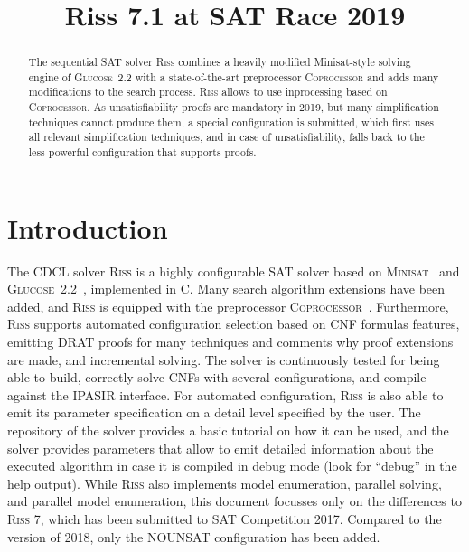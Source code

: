 \documentclass[conference]{IEEEtran}
\def\CC{{C\nolinebreak[4]\hspace{-.05em}\raisebox{.4ex}{\tiny\bf ++}}}
\begin{document}
	
\title{Riss 7.1 at SAT Race 2019}

\author{
}

\maketitle

\def\coprocessor{\textsc{Coprocessor}\xspace}
\def\glucose{\textsc{Glucose~2.2}\xspace}
\def\minisat{\textsc{Minisat~2.2}\xspace}
\def\riss{\textsc{Riss}\xspace}
\def\priss{\textsc{Priss}\xspace}

\begin{abstract}
The sequential SAT solver \riss combines a heavily modified Minisat-style solving engine of \glucose with a state-of-the-art preprocessor \textsc{Coprocessor} and adds many modifications to the search process. 
\riss allows to use inprocessing based on \coprocessor.
As unsatisfiability proofs are mandatory in 2019, but many simplification techniques cannot produce them, a special configuration is submitted, which first uses all relevant simplification techniques, and in case of unsatisfiability, falls back to the less powerful configuration that supports proofs.
\end{abstract}

\section{Introduction}

The CDCL solver \riss is a highly configurable SAT solver based on \textsc{Minisat}~\cite{EenS:2003} and \glucose ~\cite{AudemardS:2009,Audemard:2012:RRS:2405292.2405308}, implemented in \CC. 
Many search algorithm extensions have been added, and \riss is equipped with the preprocessor \textsc{Coprocessor}~\cite{Manthey:2012}. 
Furthermore, \riss supports automated configuration selection based on CNF formulas features, emitting DRAT proofs for many techniques and comments why proof extensions are made, and incremental solving.
The solver is continuously tested for being able to build, correctly solve CNFs with several configurations, and compile against the IPASIR interface.
For automated configuration, \riss is also able to emit its parameter specification on a detail level specified by the user.
The repository of the solver provides a basic tutorial on how it can be used, and the solver provides parameters that allow to emit detailed information about the executed algorithm in case it is compiled in debug mode (look for ``debug'' in the help output).
While \riss also implements model enumeration, parallel solving, and parallel model enumeration, this document focusses only on the differences to \textsc{Riss 7}, which has been submitted to SAT Competition 2017. 
Compared to the version of 2018, only the \textsc{NOUNSAT} configuration has been added.
\end{document}
